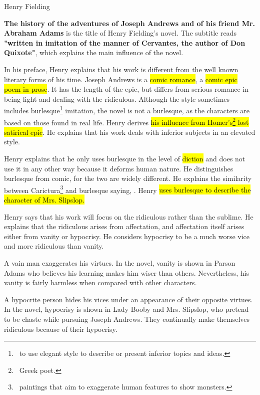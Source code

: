 \documentclass[12pt, a4paper]{article}
\begin{document}
\titlehead{Joseph Andrews}{Henry Fielding}



\textbf{The history of the adventures of Joseph Andrews and of his friend Mr. Abraham Adams} is the 
title of Henry Fielding's novel. The subtitle reads \textbf{"written in imitation of the manner of Cervantes,
the author of Don Quixote"}, which explains the main influence of the novel. 


\ind In his preface, Henry explains that his work is different from the well known
literary forms of his time. Joseph Andrews is a \hl{comic romance}, a \hl{comic epic
poem in prose}. It has the length of the epic, but differs from serious romance
in being light and dealing with the ridiculous. Although the style sometimes 
includes burlesque\footnote{\, to use elegant style to describe or present 
inferior topics and ideas.} imitation, the novel is not a burlesque, as the characters are
based on those found in real life. Henry derives \hl{his influence from Homer's\footnote{
\, Greek poet.} lost satirical epic}. He explains that his work deals with inferior subjects
in an elevated style.


\ind Henry explains that he only uses burlesque in the level of \hl{diction}
and does not use it in any other way because it deforms human nature. He 
distinguishes burlesque from comic, for the two are widely different. He
explains the similarity between Carictura\footnote{\, paintings that aim to
exaggerate human features to show monsters.} and burlesque saying,
. Henry \hl{uses
burlesque to describe the character of Mrs. Slipslop.}



\ind Henry says that his work will focus on the ridiculous rather than the sublime.
He explains that the ridiculous arises from affectation, and 
affectation itself arises either from vanity or hypocrisy.
He considers hypocrisy to be a much worse vice and more ridiculous than vanity.


A vain man exaggerates his virtues. In the novel, vanity is shown in Parson Adams who
believes his learning makes him wiser than  others. Nevertheless, his vanity is fairly 
harmless when compared with other characters.


A hypocrite person hides his vices under an appearance of their opposite virtues. 
In the novel, hypocrisy is shown in 
Lady Booby and Mrs. Slipslop, who pretend to be chaste while pursuing Joseph Andrews.
They continually make themselves ridiculous because of their hypocrisy.







  
\end{document}
